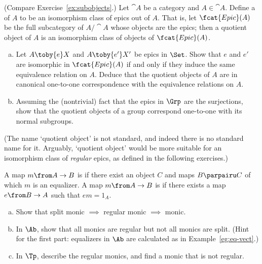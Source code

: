\begin{question}        
\label{ex:qt-objects}
(Compare Exercise~\ref{ex:subobjects}.)  Let $\cat{A}$ be a category and $A
\in \cat{A}$.  Define a  of $A$ to be an isomorphism class of epics out of $A$.  That is,
let $\fcat{Epic}(A)$ be the full subcategory of $A/\cat{A}$ whose objects
are the epics; then a quotient object of $A$ is an isomorphism class of
objects of $\fcat{Epic}(A)$.
% 
\begin{enumerate}[(b)]
\item  
Let $A \toby{e} X$ and $A \toby{e'} X'$ be epics in $\Set$.  Show that $e$
and $e'$ are isomorphic in $\fcat{Epic}(A)$ if and only if they induce the
same equivalence%
%
%
relation on $A$.  Deduce that the quotient objects of $A$ are in canonical
one-to-one correspondence with the equivalence relations on $A$.

\item 
Assuming the (nontrivial) fact that the epics in $\Grp$ are the
surjections, show that the quotient objects of a group correspond
one-to-one with its normal%
%
%
subgroups.
\end{enumerate}
% 
(The name `quotient object' is not standard, and indeed there is no
standard name for it.  Arguably, `quotient object' would be more suitable
for an isomorphism class of \emph{regular} epics, as defined in the
following exercises.)
\end{question}


\begin{question}        
\label{ex:reg-split-monic}
A map $m\from A \to B$ is  if there exist an object $C$ and maps $B \parpairu C$ of which $m$
is an equalizer.  A map $m\from A \to B$ is  if there exists a map $e\from B \to A$ such that $em = 1_A$.
% 
\begin{enumerate}[(b)]
\item 
Show that split monic $\implies$ regular monic $\implies$ monic.

\item 
In $\Ab$, show that all monics are regular but not all monics are split.
(Hint for the first part: equalizers in $\Ab$ are calculated as in
Example~\ref{eg:eq-vect}.)

\item 
In $\Tp$, describe the regular monics, and find a monic that is not
regular.  
\end{enumerate}
\end{question}



